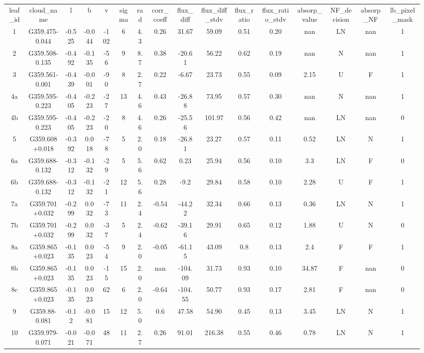 \begin{table}
\begin{tabular}{cccccccccccccccc}
leaf_id & cloud_name & l & b & v & sigma & rad & corr_coeff & flux_diff & flux_diff_stdv & flux_ratio & flux_ratio_stdv & absorp_value & NF_decision & absorp_NF & lb_pixel_mask \\
1 & G359.475-0.044 & -0.525 & -0.044 & -102 & 6 & 4.3 & 0.26 & 31.67 & 59.09 & 0.51 & 0.20 & nan & LN & nan & 1 \\
2 & G359.508-0.135 & -0.492 & -0.135 & -56 & 9 & 8.7 & 0.38 & -20.61 & 56.22 & 0.62 & 0.19 & nan & N & nan & 1 \\
3 & G359.561-0.001 & -0.439 & -0.001 & -90 & 8 & 2.7 & 0.22 & -6.67 & 23.73 & 0.55 & 0.09 & 2.15 & U & F & 1 \\
4a & G359.595-0.223 & -0.405 & -0.223 & -27 & 13 & 4.6 & 0.43 & -26.88 & 73.95 & 0.57 & 0.30 & nan & N & nan & 1 \\
4b & G359.595-0.223 & -0.405 & -0.223 & -20 & 8 & 4.6 & 0.26 & -25.56 & 101.97 & 0.56 & 0.42 & nan & LN & nan & 0 \\
5 & G359.608+0.018 & -0.392 & 0.018 & -78 & 5 & 2.0 & 0.18 & -26.81 & 23.27 & 0.57 & 0.11 & 0.52 & LN & N & 1 \\
6a & G359.688-0.132 & -0.312 & -0.132 & -29 & 5 & 5.6 & 0.62 & 0.23 & 25.94 & 0.56 & 0.10 & 3.3 & LN & F & 0 \\
6b & G359.688-0.132 & -0.312 & -0.132 & -21 & 12 & 5.6 & 0.28 & -9.2 & 29.84 & 0.58 & 0.10 & 2.28 & U & F & 1 \\
7a & G359.701+0.032 & -0.299 & 0.032 & -73 & 11 & 2.4 & -0.54 & -44.22 & 32.34 & 0.66 & 0.13 & 0.36 & LN & N & 1 \\
7b & G359.701+0.032 & -0.299 & 0.032 & -37 & 5 & 2.4 & -0.62 & -39.16 & 29.91 & 0.65 & 0.12 & 1.88 & U & N & 0 \\
8a & G359.865+0.023 & -0.135 & 0.023 & -54 & 9 & 2.0 & -0.05 & -61.15 & 43.09 & 0.8 & 0.13 & 2.4 & F & F & 1 \\
8b & G359.865+0.023 & -0.135 & 0.023 & -15 & 15 & 2.0 & nan & -104.09 & 31.73 & 0.93 & 0.10 & 34.87 & F & nan & 0 \\
8c & G359.865+0.023 & -0.135 & 0.023 & 62 & 6 & 2.0 & -0.64 & -104.55 & 50.77 & 0.93 & 0.17 & 2.81 & F & nan & 0 \\
9 & G359.88-0.081 & -0.12 & -0.081 & 15 & 12 & 5.0 & 0.6 & 47.58 & 54.90 & 0.45 & 0.13 & 3.45 & LN & N & 1 \\
10 & G359.979-0.071 & -0.021 & -0.071 & 48 & 11 & 2.7 & 0.26 & 91.01 & 216.38 & 0.55 & 0.46 & 0.78 & LN & N & 1 \\

\end{tabular}
\end{table}

